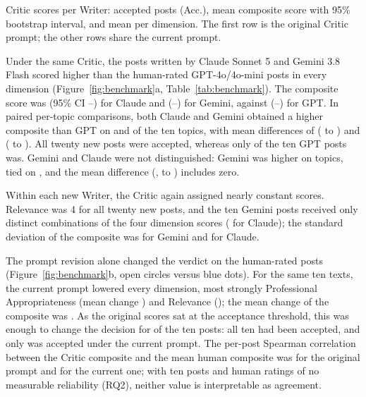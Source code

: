 \documentclass[a4paper,twoside]{article}
\begin{document}
\begin{table}[t]
\centering
\caption{Critic scores per Writer: accepted posts (Acc.), mean composite score with 95\% bootstrap interval, and mean per dimension. The first row is the original Critic prompt; the other rows share the current prompt.}
\label{tab:benchmark}
\begin{adjustbox}{max width=\columnwidth}

\end{adjustbox}
\end{table}

Under the same Critic, the posts written by Claude Sonnet 5 and Gemini 3.8 Flash scored higher than the human-rated GPT-4o/4o-mini posts in every dimension (Figure~\ref{fig:benchmark}a, Table~\ref{tab:benchmark}). The composite score was \BmClaComp{} (95\% CI \BmClaCompLo{}--\BmClaCompHi{}) for Claude and \BmGemComp{} (\BmGemCompLo{}--\BmGemCompHi{}) for Gemini, against \BmGptComp{} (\BmGptCompLo{}--\BmGptCompHi{}) for GPT. In paired per-topic comparisons, both Claude and Gemini obtained a higher composite than GPT on \BmWinsClaGpt{} and \BmWinsGemGpt{} of the ten topics, with mean differences of \BmDiffClaGpt{} (\BmDiffClaGptLo{} to \BmDiffClaGptHi{}) and \BmDiffGemGpt{} (\BmDiffGemGptLo{} to \BmDiffGemGptHi{}). All twenty new posts were accepted, whereas only \BmGptAccept{} of the ten GPT posts was. Gemini and Claude were not distinguished: Gemini was higher on \BmWinsGemCla{} topics, tied on \BmTiesGemCla{}, and the mean difference (\BmDiffGemCla{}, \BmDiffGemClaLo{} to \BmDiffGemClaHi{}) includes zero.

Within each new Writer, the Critic again assigned nearly constant scores. Relevance was 4 for all twenty new posts, and the ten Gemini posts received only \BmGemVectors{} distinct combinations of the four dimension scores (\BmClaVectors{} for Claude); the standard deviation of the composite was \BmGemCompSD{} for Gemini and \BmClaCompSD{} for Claude.

The prompt revision alone changed the verdict on the human-rated posts (Figure~\ref{fig:benchmark}b, open circles versus blue dots). For the same ten texts, the current prompt lowered every dimension, most strongly Professional Appropriateness (mean change \BmShiftPro{}) and Relevance (\BmShiftRel{}); the mean change of the composite was \BmShiftComp{}. As the original scores sat at the acceptance threshold, this was enough to change the decision for \BmShiftDecisions{} of the ten posts: all ten had been accepted, and only \BmGptAccept{} was accepted under the current prompt. The per-post Spearman correlation between the Critic composite and the mean human composite was \BmRhoOldComp{} for the original prompt and \BmRhoNewComp{} for the current one; with ten posts and human ratings of no measurable reliability (RQ2), neither value is interpretable as agreement.
\end{document}
